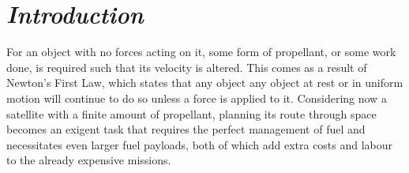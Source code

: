 \documentclass[12pt, english]{report}
\begin{document}
\clearpage

\setlength{\cftbeforeloftitleskip}{-22pt}
\renewcommand{\cftloftitlefont}{\hfill\huge\bfseries}
\renewcommand{\cftafterloftitle}{\hfill}
\listoffigures

\clearpage

\setlength{\cftbeforelottitleskip}{-22pt}
\renewcommand{\cftlottitlefont}{\hfill\huge\bfseries}
\renewcommand{\cftafterlottitle}{\hfill}
\listoftables


\cleardoublepage

\chapter{\textsl{Introduction}}
\normalsize{\noindent For an object with no forces acting on it, some form of propellant, or some work done, is required such that its velocity is altered. This comes as a result of Newton's First Law, which states that any object any object at rest or in uniform motion will continue to do so unless a force is applied to it. Considering now a satellite with a finite amount of propellant, planning its route through space becomes an exigent task that requires the perfect management of fuel and necessitates even larger fuel payloads, both of which add extra costs and labour to the already expensive missions.}
\end{document}
